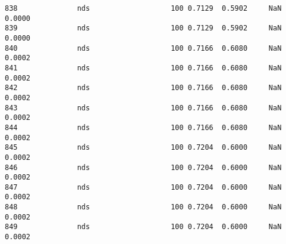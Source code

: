 \documentclass[11pt]{article}
\begin{document}
\begin{Verbatim}[commandchars=\\\{\}]
838              nds                   100 0.7129  0.5902     NaN 0.0000   
839              nds                   100 0.7129  0.5902     NaN 0.0000   
840              nds                   100 0.7166  0.6080     NaN 0.0002   
841              nds                   100 0.7166  0.6080     NaN 0.0002   
842              nds                   100 0.7166  0.6080     NaN 0.0002   
843              nds                   100 0.7166  0.6080     NaN 0.0002   
844              nds                   100 0.7166  0.6080     NaN 0.0002   
845              nds                   100 0.7204  0.6000     NaN 0.0002   
846              nds                   100 0.7204  0.6000     NaN 0.0002   
847              nds                   100 0.7204  0.6000     NaN 0.0002   
848              nds                   100 0.7204  0.6000     NaN 0.0002   
849              nds                   100 0.7204  0.6000     NaN 0.0002   


\end{Verbatim}
\end{document}
